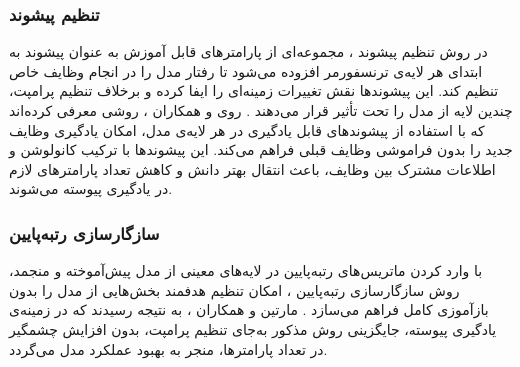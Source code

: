  
\subsubsection{تنظیم پیشوند}
 در روش تنظیم پیشوند ، مجموعه‌ای از پارامتر‌های قابل آموزش به عنوان پیشوند به ابتدای هر لایه‌ی ترنسفورمر افزوده می‌شود تا رفتار مدل را در انجام وظایف خاص تنظیم کند. این پیشوندها نقش تغییرات زمینه‌ای را ایفا کرده و برخلاف تنظیم پرامپت، چندین لایه از مدل را تحت تأثیر قرار می‌دهند \cite{llm_continual}. روی و همکاران \cite{prefix-tuning}، روشی معرفی کرده‌اند که با استفاده از پیشوندهای قابل یادگیری در هر لایه‌ی مدل، امکان یادگیری وظایف جدید را بدون فراموشی وظایف قبلی فراهم می‌کند. این پیشوندها با ترکیب کانولوشن و اطلاعات مشترک بین وظایف، باعث انتقال بهتر دانش و کاهش تعداد پارامتر‌های لازم در یادگیری پیوسته می‌شوند.
 
\subsubsection{سازگار‌سازی رتبه‌پایین}
 با وارد کردن ماتریس‌های رتبه‌پایین در لایه‌های معینی از مدل پیش‌آموخته و منجمد، روش سازگار‌سازی رتبه‌پایین ، امکان تنظیم هدفمند بخش‌هایی از مدل را بدون بازآموزی کامل فراهم می‌سازد \cite{llm_continual}. مارتین و همکاران \cite{lora}، به نتیجه رسیدند که در زمینه‌ی یادگیری پیوسته، جایگزینی روش مذکور به‌جای تنظیم پرامپت، بدون افزایش چشمگیر در تعداد پارامتر‌ها، منجر به بهبود عملکرد مدل می‌گردد.
 
